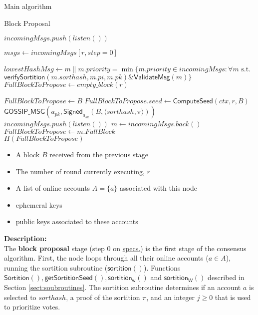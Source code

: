 \documentclass[10pt,a4paper]{article}
\begin{document}
\begin{section}{Main algorithm}
\begin{subsection}{Block Proposal}
\begin{algorithm}
\begin{algorithmic}[1]
            \State $incomingMsgs.push(listen())$
        \EndWhile

        \State $msgs \gets incomingMsgs[r, step=0]$

        \State $lowestHashMsg \gets m \| m.priority = \min \{m.priority \in incomingMsgs : \forall m \text{ s.t. } $\newline
        ${}$ {\hskip 3cm}  $\mathsf{verifySortition}(m.sorthash, m.pi, m.pk) \& \mathsf{ValidateMsg}(m) \}$ \\

        \State $FullBlockToPropose \gets empty\_block(r)$ 

            \State $FullBlockToPropose \gets B$
            \State $FullBlockToPropose.seed \gets \mathsf{ComputeSeed}(ctx, r, B)$
            \State $\mathsf{GOSSIP\_MSG}(a_{pk}, \mathsf{Signed}_{a_{sk}}(B, \langle sorthash, \pi \rangle))$
        \Else
        {
                \State $incomingMsgs.push(listen())$
                \State $m \gets incomingMsgs.back()$
                    \State $FullBlockToPropose \gets m.FullBlock$
                \EndIf
            \EndWhile \\
        }
        \EndIf
        \Return $H(FullBlockToPropose)$
    \EndFunction
    \end{algorithmic}
    \caption{\underline{Block proposal}}
\end{algorithm}

\newpage
{}
\begin{itemize}
    \item A block $B$ received from the previous stage
    \item The number of round currently executing, $r$
    \item A list of online accounts  $A=\{a\}$ associated with this node
    \item ephemeral keys
    \item public keys associated to these accounts
  \end{itemize}
\noindent \textbf{Description:}\\
The {\bf block proposal} stage (step 0 on \href{https://github.com/algorandfoundation/specs}{specs.}) is the first stage of the 
consensus algorithm. 
First, the node loops through all their online accounts ($a\in A$), 
running the sortition subroutine ($\mathsf{sortition}()$).
Functions  $\mathsf{Sortition}(), \mathsf{getSortitionSeed}(), \mathsf{sortition_w}()$ and
$\mathsf{sortition_W}()$ described in Section \ref{sect:soubroutines}.
The sortition subroutine determines if an account $a$ is selected to 
${sorthash}$, a proof of the sortition $\pi$, and an integer $j\ge 0$
that is used to prioritize votes.


\end{subsection}
\end{section}
\end{document}
